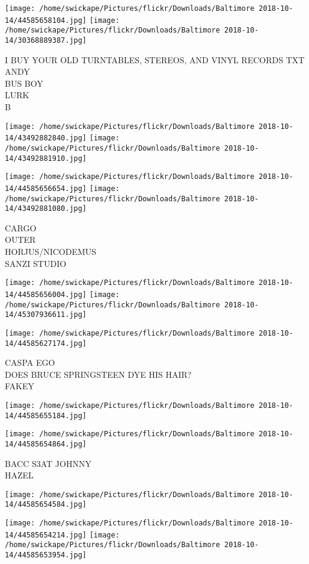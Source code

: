 \documentclass[10pt,letterpaper]{article}
\begin{document}
\texttt{[image: /home/swickape/Pictures/flickr/Downloads/Baltimore 2018-10-14/44585658104.jpg]}
\texttt{[image: /home/swickape/Pictures/flickr/Downloads/Baltimore 2018-10-14/30368889387.jpg]}

I BUY YOUR OLD TURNTABLES, STEREOS, AND VINYL RECORDS TXT ANDY\\
BUS BOY\\
LURK\\
B
\pagebreak

\texttt{[image: /home/swickape/Pictures/flickr/Downloads/Baltimore 2018-10-14/43492882840.jpg]}
\texttt{[image: /home/swickape/Pictures/flickr/Downloads/Baltimore 2018-10-14/43492881910.jpg]}

\texttt{[image: /home/swickape/Pictures/flickr/Downloads/Baltimore 2018-10-14/44585656654.jpg]}
\texttt{[image: /home/swickape/Pictures/flickr/Downloads/Baltimore 2018-10-14/43492881080.jpg]}

CARGO\\
OUTER\\
HORJUS/NICODEMUS\\
SANZI STUDIO
\pagebreak

\texttt{[image: /home/swickape/Pictures/flickr/Downloads/Baltimore 2018-10-14/44585656004.jpg]}
\texttt{[image: /home/swickape/Pictures/flickr/Downloads/Baltimore 2018-10-14/45307936611.jpg]}

\texttt{[image: /home/swickape/Pictures/flickr/Downloads/Baltimore 2018-10-14/44585627174.jpg]}

CASPA EGO\\
DOES BRUCE SPRINGSTEEN DYE HIS HAIR?\\
FAKEY
\pagebreak

\texttt{[image: /home/swickape/Pictures/flickr/Downloads/Baltimore 2018-10-14/44585655184.jpg]}

\vspace{0.25in}
\texttt{[image: /home/swickape/Pictures/flickr/Downloads/Baltimore 2018-10-14/44585654864.jpg]}

BACC S3AT JOHNNY\\
HAZEL
\pagebreak

\texttt{[image: /home/swickape/Pictures/flickr/Downloads/Baltimore 2018-10-14/44585654584.jpg]}

\vspace{0.25in}
\texttt{[image: /home/swickape/Pictures/flickr/Downloads/Baltimore 2018-10-14/44585654214.jpg]}
\texttt{[image: /home/swickape/Pictures/flickr/Downloads/Baltimore 2018-10-14/44585653954.jpg]}
\end{document}
